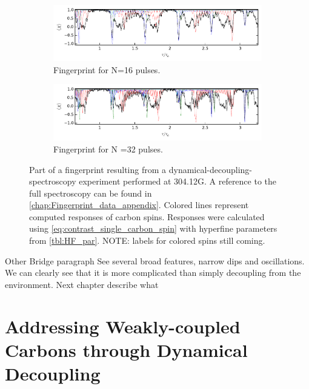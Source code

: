 \begin{figure}[htbp]

    \begin{subfigure}[t]{\textwidth}\centering
        \centering
        \includegraphics{Img/fingerprint16.pdf}
        \caption{Fingerprint for N=16 pulses. }
        \label{fig:FP16}
    \end{subfigure}

    \begin{subfigure}[t]{\textwidth}\centering
        \centering
        \includegraphics{Img/fingerprint32.pdf}
        \caption{Fingerprint for N =32 pulses. }
        \label{fig:FP32}
    \end{subfigure}
    \caption{Part of a fingerprint resulting from a dynamical-decoupling-spectroscopy experiment performed at 304.12G. A reference to the full spectroscopy can be found in \cref{chap:Fingerprint_data_appendix}.  Colored lines represent computed responses of carbon spins. Responses were calculated using \cref{eq:contrast_single_carbon_spin} with hyperfine parameters from \cref{tbl:HF_par}. NOTE: labels for colored spins still coming. }
    \label{fig:FP}
\end{figure}

Other Bridge paragraph
See several broad features, narrow dips and oscillations.
We can clearly see that it is more complicated than simply decoupling from the environment.
Next chapter describe what

\section{Addressing Weakly-coupled Carbons through Dynamical Decoupling}
\label{controllingacarbonthroughdynamicaldecoupling}

